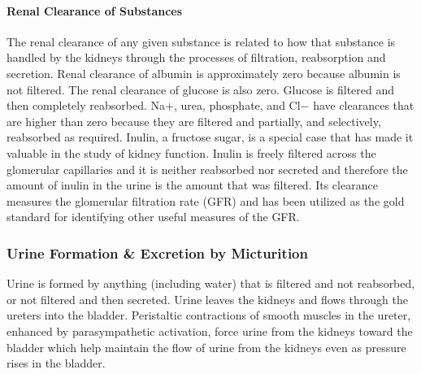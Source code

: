 \paragraph{Renal Clearance of Substances}

The renal clearance of any given substance is related to how that substance is handled by the kidneys through the processes of filtration, reabsorption and secretion. Renal clearance of albumin is approximately zero because albumin is not filtered. The renal clearance of glucose is also zero. Glucose is filtered and then completely reabsorbed. Na+, urea, phosphate, and Cl− have clearances that are higher than zero because they are filtered and partially, and selectively, reabsorbed as required. Inulin, a fructose sugar, is a special case that has made it valuable in the study of kidney function. Inulin is freely filtered across the glomerular capillaries and it is neither reabsorbed nor secreted and therefore the amount of inulin in the urine is the amount that was filtered. Its clearance measures the glomerular filtration rate (GFR) and has been utilized as the gold standard for identifying other useful measures of the GFR.


\subsubsection{Urine Formation \& Excretion by Micturition}

Urine is formed by anything (including water) that is filtered and not reabsorbed, or not filtered and then secreted. Urine leaves the kidneys and flows through the ureters into the bladder. Peristaltic contractions of smooth muscles in the ureter, enhanced by parasympathetic activation, force urine from the kidneys toward the bladder which help maintain the flow of urine from the kidneys even as pressure rises in the bladder. 

